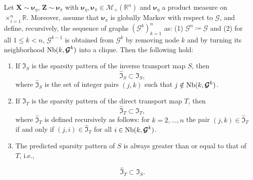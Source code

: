 \documentclass[twoside,11pt]{article}
\newcommand{\borelm}{\mathscr{M}}
\newcommand{\borelmp}{\borelm_+}
\newcommand{\genm}{\boldsymbol{\nu} }   %
\newcommand{\re}{\mathbb{R}}
\newcommand{\Xb}{\boldsymbol{X}}
\newcommand{\Zb}{\boldsymbol{Z}}
\newcommand{\Gcb}{\boldsymbol{\mathcal{G}}}
\newcommand{\sparse}{ \mathfrak{I} }
\newcommand{\neigh}{ {\rm Nb} }
\begin{document}
\begin{theorem} \label{thm:sparsityRosenblatt}
%
%
Let $\Xb \sim \genm_\eta$, $\Zb \sim \genm_\pi$ with 
$\genm_\eta,\genm_\pi \in \borelmp(\re^n)$ and 
$\genm_\eta$ a product measure on 
%
$\times_{i=1}^n\mathbb{R}$.
%
%
%
%
Moreover, assume that
$\genm_\pi$ is globally Markov with respect to $\Gcb$,
and
%
define, recursively, the sequence of graphs $(\Gcb^k)_{k=1}^n$ as:
(1) $\Gcb^n \coloneqq \Gcb$ and (2) for all
$1\le k < n$, $\Gcb^{k-1}$ is obtained from $\Gcb^{k}$ by removing node $k$ and by 
turning its neighborhood $\neigh (k,\Gcb^k)$ into a clique.
%
%
%
%
%
%
Then the following hold:
  \begin{enumerate}
    \item \label{thm:sparsityRosenblatt:inverse}  
    If $\sparse_S$ is the sparsity pattern
    of the inverse transport map $S$, then 
      \begin{equation} \label{eq:superSetInverse}
      \widehat{\sparse}_S \subset \sparse_S,
      \end{equation}                    
    where   $\widehat{\sparse}_S$ is the set of integer pairs $(j,k)$ 
    such that $j \notin \neigh (k, \Gcb^k) $.       
    \medskip
              
    \item \label{thm:sparsityRosenblatt:direct} 
    If $\sparse_T$ is the sparsity pattern
    of the direct transport map $T$, then
      \begin{equation}  \label{eq:superSetDirect}
      \widehat{\sparse}_T \subset \sparse_T,
      \end{equation}                    
    where   $\widehat{\sparse}_T$ 
%
    is defined recursively as follows:
    for $k=2,\ldots,n$ the pair $(j,k) \in \widehat{\sparse}_T$
    if and only if
    $(j,i)\in \widehat{\sparse}_T$
    for all $ i\in \neigh (k, \Gcb^k)$.   
    \smallskip

    \item \label{thm:sparsityRosenblatt:inclusion}  
    The predicted sparsity pattern of $S$ is always greater than or
    equal to that of $T$, i.e.,

      \begin{equation} \label{eq:inclusion}
      \widehat{\sparse}_T \subset \widehat{\sparse}_S. 
      \end{equation}            
  \end{enumerate}                  
\end{theorem}
\end{document}
